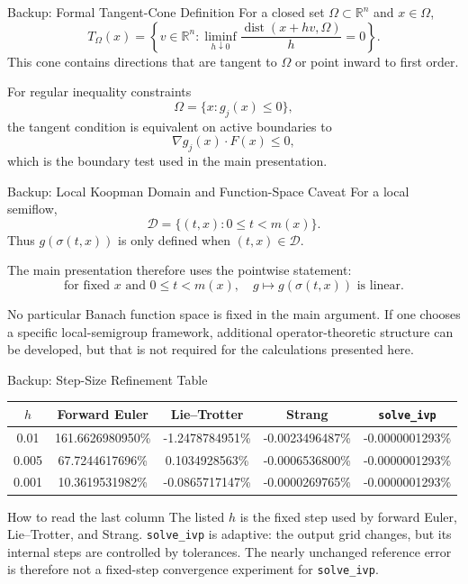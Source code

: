 \documentclass[aspectratio=169,11pt]{beamer}
\newcommand{\R}{\mathbb{R}}
\begin{document}
\begin{frame}{Backup: Formal Tangent-Cone Definition}
\small
For a closed set \(\Omega\subset\R^n\) and \(x\in\Omega\),
\[
\boxed{
T_\Omega(x)
=
\left\{
v\in\R^n:
\liminf_{h\downarrow0}
\frac{\operatorname{dist}(x+h v,\Omega)}{h}=0
\right\}.
}
\]
This cone contains directions that are tangent to \(\Omega\) or point inward to first order.

For regular inequality constraints
\[
\Omega=\{x:g_j(x)\le0\},
\]
the tangent condition is equivalent on active boundaries to
\[
\nabla g_j(x)\cdot F(x)\le0,
\]
which is the boundary test used in the main presentation.
\end{frame}

\begin{frame}{Backup: Local Koopman Domain and Function-Space Caveat}
\small
For a local semiflow,
\[
\mathcal D=\{(t,x):0\le t<m(x)\}.
\]
Thus \(g(\sigma(t,x))\) is only defined when \((t,x)\in\mathcal D\).

The main presentation therefore uses the pointwise statement:
\[
\boxed{
\text{for fixed }x\text{ and }0\le t<m(x),\quad
g\mapsto g(\sigma(t,x))
\text{ is linear}.
}
\]

No particular Banach function space is fixed in the main argument. If one chooses a specific local-semigroup framework, additional operator-theoretic structure can be developed, but that is not required for the calculations presented here.
\end{frame}

\begin{frame}{Backup: Step-Size Refinement Table}
\centering
\scriptsize
\setlength{\tabcolsep}{3.0pt}
\renewcommand{\arraystretch}{1.25}
\begin{tabular}{ccccc}
\toprule
\(h\) & Forward Euler & Lie--Trotter & Strang & \texttt{solve\_ivp} \\
\midrule
0.01  & 161.6626980950\% & -1.2478784951\% & -0.0023496487\% & -0.0000001293\% \\
0.005 & 67.7244617696\%  &  0.1034928563\% & -0.0006536800\% & -0.0000001293\% \\
0.001 & 10.3619531982\%  & -0.0865717147\% & -0.0000269765\% & -0.0000001293\% \\
\bottomrule
\end{tabular}

\vspace{0.7em}
\begin{alertblock}{How to read the last column}
The listed \(h\) is the fixed step used by forward Euler, Lie--Trotter, and Strang. \texttt{solve\_ivp} is adaptive: the output grid changes, but its internal steps are controlled by tolerances. The nearly unchanged reference error is therefore not a fixed-step convergence experiment for \texttt{solve\_ivp}.
\end{alertblock}
\end{frame}
\end{document}
